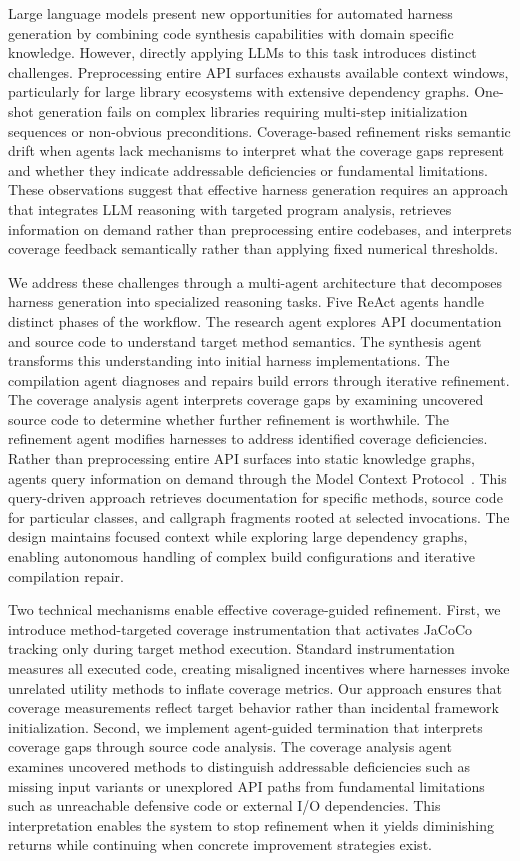 Large language models present new opportunities for automated harness generation by combining code synthesis capabilities with domain specific knowledge. However, directly applying LLMs to this task introduces distinct challenges. Preprocessing entire API surfaces exhausts available context windows, particularly for large library ecosystems with extensive dependency graphs. One-shot generation fails on complex libraries requiring multi-step initialization sequences or non-obvious preconditions. Coverage-based refinement risks semantic drift when agents lack mechanisms to interpret what the coverage gaps represent and whether they indicate addressable deficiencies or fundamental limitations. These observations suggest that effective harness generation requires an approach that integrates LLM reasoning with targeted program analysis, retrieves information on demand rather than preprocessing entire codebases, and interprets coverage feedback semantically rather than applying fixed numerical thresholds.

We address these challenges through a multi-agent architecture that decomposes harness generation into specialized reasoning tasks. Five ReAct agents handle distinct phases of the workflow. The research agent explores API documentation and source code to understand target method semantics. The synthesis agent transforms this understanding into initial harness implementations. The compilation agent diagnoses and repairs build errors through iterative refinement. The coverage analysis agent interprets coverage gaps by examining uncovered source code to determine whether further refinement is worthwhile. The refinement agent modifies harnesses to address identified coverage deficiencies. Rather than preprocessing entire API surfaces into static knowledge graphs, agents query information on demand through the Model Context Protocol~\cite{mcp}. This query-driven approach retrieves documentation for specific methods, source code for particular classes, and callgraph fragments rooted at selected invocations. The design maintains focused context while exploring large dependency graphs, enabling autonomous handling of complex build configurations and iterative compilation repair.

Two technical mechanisms enable effective coverage-guided refinement. First, we introduce method-targeted coverage instrumentation that activates JaCoCo tracking only during target method execution. Standard instrumentation measures all executed code, creating misaligned incentives where harnesses invoke unrelated utility methods to inflate coverage metrics. Our approach ensures that coverage measurements reflect target behavior rather than incidental framework initialization. Second, we implement agent-guided termination that interprets coverage gaps through source code analysis. The coverage analysis agent examines uncovered methods to distinguish addressable deficiencies such as missing input variants or unexplored API paths from fundamental limitations such as unreachable defensive code or external I/O dependencies. This interpretation enables the system to stop refinement when it yields diminishing returns while continuing when concrete improvement strategies exist.

